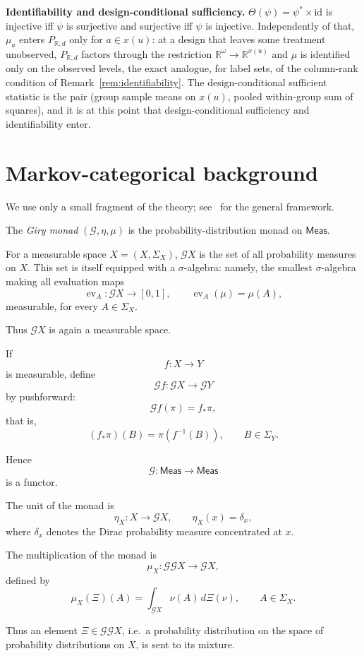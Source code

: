 \documentclass[11pt,a4paper]{article}
\theoremstyle{plain}
\theoremstyle{definition}
\theoremstyle{remark}
\newcommand{\cat}[1]{\mathsf{#1}}
\newcommand{\Meas}{\cat{Meas}}
\newcommand{\G}{\mathcal{G}}
\newcommand{\id}{\mathrm{id}}
\newcommand{\R}{\mathbb{R}}
\begin{document}
\noindent \textbf{Identifiability and design-conditional sufficiency.} $\Theta(\psi) = \psi^{*} \times \id$ is
injective iff $\psi$ is surjective and surjective iff $\psi$ is injective.
Independently of that, $\mu_a$ enters $P_{\R,d}$ only for $a \in x(u)$: at a
design that leaves some treatment unobserved, $P_{\R,d}$ factors through the
restriction $\R^{\omega} \to \R^{x(u)}$ and $\mu$ is identified only on the
observed levels, the exact analogue, for label sets, of the column-rank
condition of Remark~\ref{rem:identifiability}. The design-conditional
sufficient statistic is the pair (group sample means on $x(u)$, pooled
within-group sum of squares), and it is at this point that design-conditional
sufficiency and identifiability enter.

\section{Markov-categorical background}\label{sec:markov}

We use only a small fragment of the theory; see~\cite{fritz_synthetic_2020,perrone_markov_2024}
for the general framework.

The \emph{Giry monad} $(\G,\eta,\mu)$ is the probability-distribution monad on $\Meas$.

For a measurable space \(X=(X,\Sigma_X)\), $\G X$ is the set of all probability measures on \(X\). This set is itself equipped with a \(\sigma\)-algebra: namely, the smallest \(\sigma\)-algebra making all evaluation maps
\[
\operatorname{ev}_A:\mathcal G X\to [0,1],
\qquad
\operatorname{ev}_A(\mu)=\mu(A),
\]
measurable, for every \(A\in\Sigma_X\).

Thus \(\mathcal G X\) is again a measurable space.

If
\[
f: X\to Y
\]
is measurable, define
\[
\mathcal G f:\G X\to \G Y
\]
by pushforward:
\[
\G f(\pi)=f_\ast\pi,
\]
that is,
\[
(f_\ast\pi)(B)=\pi(f^{-1}(B)),
\qquad
B\in\Sigma_Y.
\]

Hence
\[
\mathcal G:\Meas\to\Meas
\]
is a functor.

The unit of the monad is
\[
\eta_X:X\to \G X,
\qquad
\eta_X(x)=\delta_x,
\]
where \(\delta_x\) denotes the Dirac probability measure concentrated at \(x\).

The multiplication of the monad is
\[
\mu_X:\G\G X\to\G X,
\]
defined by
\[
\mu_X(\Xi)(A)
=
\int_{\G X}\nu(A)\,d\Xi(\nu),
\qquad
A\in\Sigma_X.
\]

Thus an element \(\Xi\in\G\G X\), i.e.\ a probability distribution on the space of probability distributions on \(X\), is sent to its mixture.
\end{document}
